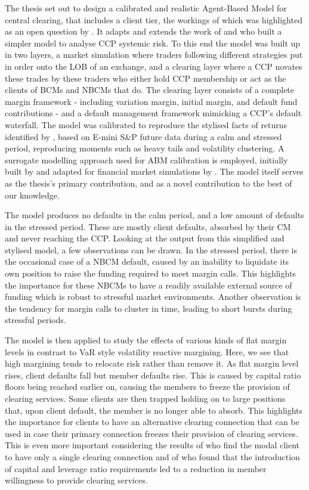 The thesis set out to design a calibrated and realistic Agent-Based Model for central clearing, that includes a client tier, the workings of which was highlighted as an open question by \cite{menkveld_vuillemey_2021}. It adapts and extends the work of \cite{deloitte_ccp} and \cite{simudyne_odd} who built a simpler model to analyse CCP systemic risk. To this end the model was built up in two layers, a market simulation where traders following different strategies put in order onto the LOB of an exchange, and a clearing layer where a CCP novates these trades by these traders who either hold CCP membership or act as the clients of BCMs and NBCMs that do. The clearing layer consists of a complete margin framework - including variation margin, initial margin, and default fund contributions - and a default management framework mimicking a CCP's default waterfall. The model was calibrated to reproduce the stylised facts of returns identified by \cite{cont_2001}, based on E-mini S\&P future data during a calm and stressed period, reproducing moments such as heavy tails and volatility clustering. A surrogate modelling approach used for ABM calibration is employed, initially built by \cite{lamperti_2018} and adapted for financial market simulations by \cite{gao_2022_xgb}. The model itself serves as the thesis's primary contribution, and as a novel contribution to the best of our knowledge.

The model produces no defaults in the calm period, and a low amount of defaults in the stressed period. These are mostly client defaults, absorbed by their CM and never reaching the CCP. Looking at the output from this simplified and stylised model, a few observations can be drawn. In the stressed period, there is the occasional case of a NBCM default, caused by an inability to liquidate its own position to raise the funding required to meet margin calls. This highlights the importance for these NBCMs to have a readily available external source of funding which is robust to stressful market environments. Another observation is the tendency for margin calls to cluster in time, leading to short bursts during stressful periods. 

The model is then applied to study the effects of various kinds of flat margin levels in contrast to VaR style volatility reactive margining. Here, we see that high margining tends to relocate risk rather than remove it. As flat margin level rises, client defaults fall but member defaults rise. This is caused by capital ratio floors being reached earlier on, causing the members to freeze the provision of clearing services. Some clients are then trapped holding on to large positions that, upon client default, the member is no longer able to absorb. This highlights the importance for clients to have an alternative clearing connection that can be used in case their primary connection freezes their provision of clearing services. This is even more important considering the results of \cite{ofr_2026} who find the modal client to have only a single clearing connection and of \cite{acosta_smith_2018} who found that the introduction of capital and leverage ratio requirements led to a reduction in member willingness to provide clearing services. 

